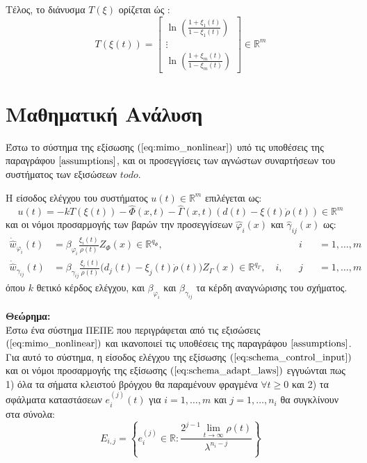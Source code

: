 Τέλος, το διάνυσμα $T(\xi)$ ορίζεται ώς :
\begin{equation*}
	T(\xi(t)) = \begin{bmatrix}
	\ln \left( \frac{1 + \xi_1(t)}{1 - \xi_1(t)} \right) \\
	\vdots \\
	\ln \left( \frac{1 + \xi_m(t)}{1 - \xi_m(t)} \right)
	\end{bmatrix}
	\in \mathbb{R}^m
\end{equation*}


\section{Μαθηματική Ανάλυση}
Έστω το σύστημα της εξίσωσης $(\ref{eq:mimo_nonlinear})$ υπό τις υποθέσεις της παραγράφου $\ref{assumptions}$, και οι προσεγγίσεις των αγνώστων συναρτήσεων του συστήματος των εξισώσεων $todo$.

Η είσοδος ελέγχου του συστήματος $u(t) \in \mathbb{R}^m$ επιλέγεται ως:
\begin{equation}
	u(t) = -k T(\xi(t)) - \hat{\Phi}(x,t) 
	     - \hat{\Gamma}(x,t) \left( d(t) - \xi(t) \dot{\rho}(t) \right)
	     \in \mathbb{R}^m
	\label{eq:schema_control_input}
\end{equation}
και οι νόμοι προσαρμογής των βαρών την προσεγγίσεων $\hat{\varphi}_i(x)$ και $\hat{\gamma}_{ij}(x)$ ως:
\begin{equation}
\begin{alignedat}{3}
	\dot{\hat{w}}_{\varphi_i}(t) &= 
	\beta_{\varphi_i} \frac{\xi_i(t)}{\rho(t)} Z_{\Phi}(x) 
	\in \mathbb{R}^{q_{\Phi}}, \quad &&i &&= 1,\dots,m \\
	\dot{\hat{w}}_{\gamma_{ij}}(t) &= \beta_{\gamma_{ij}} \frac{\xi_i(t)}{\rho(t)}
	\big( d_j(t) - \xi_j(t) \dot{\rho}(t) \big) Z_{\Gamma}(x)
	\in \mathbb{R}^{q_{\Gamma}},
	\quad i,&&j &&= 1,\dots,m
\end{alignedat}
\label{eq:schema_adapt_laws}
\end{equation}
όπου $k$ θετικό κέρδος ελέγχου, και $\beta_{\varphi_i}$ και $\beta_{\gamma_{ij}}$ τα κέρδη αναγνώρισης του σχήματος.

\textbf{Θεώρημα:}\\
Έστω ένα σύστημα ΠΕΠΕ που περιγράφεται από τις εξισώσεις $(\ref{eq:mimo_nonlinear})$ και ικανοποιεί τις υποθέσεις της παραγράφου $\ref{assumptions}$. Για αυτό το σύστημα, η είσοδος ελέγχου της εξίσωσης $(\ref{eq:schema_control_input})$ και οι νόμοι προσαρμογής της εξίσωσης $(\ref{eq:schema_adapt_laws})$ εγγυώνται πως 1) όλα τα σήματα κλειστού βρόγχου θα παραμένουν φραγμένα $\forall t\geq 0$ και 2) τα σφάλματα καταστάσεων $e_i^{(j)}(t)$ για $i=1,\dots,m$ και $j = 1,\dots,n_i$ θα συγκλίνουν στα σύνολα:
\begin{equation}
E_{i,j} = \left\{ e_i^{(j)} \in \mathbb{R} :
\frac{ 2^{j-1} \lim\limits_{t \rightarrow \infty}\rho(t)}{\lambda^{n_i - j}} \right\}
\end{equation}

